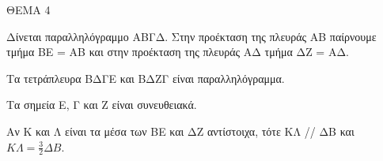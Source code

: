 
ΘΕΜΑ 4

Δίνεται παραλληλόγραμμο ΑΒΓΔ. Στην προέκταση της πλευράς ΑΒ παίρνουμε τμήμα ΒΕ = ΑΒ και στην προέκταση της πλευράς ΑΔ τμήμα ΔΖ = ΑΔ.

\begin{alist}
\item Να αποδείξετε ότι:

.}
\end{alist}
\begin{alist}
\item
  Τα τετράπλευρα ΒΔΓΕ και ΒΔΖΓ είναι παραλληλόγραμμα. 
\item
  Τα σημεία Ε, Γ και Ζ είναι συνευθειακά. 

\item Αν Κ και Λ είναι τα μέσα των ΒΕ και ΔΖ αντίστοιχα, τότε ΚΛ // ΔΒ και $Κ\Lambda = \frac{3}{2}\Delta Β$. 
\end{alist}
